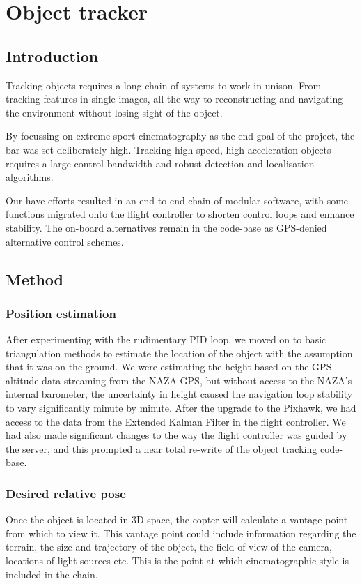 \documentclass{article}
\begin{document}
\section{Object tracker}
  \subsection{Introduction}
    Tracking objects requires a long chain of systems to work in unison.  From tracking features in single images, all the way to reconstructing and navigating the environment without losing sight of the object.


    By focussing on extreme sport cinematography as the end goal of the project, the bar was set deliberately high.
    Tracking high-speed, high-acceleration objects requires a large control bandwidth and robust detection and localisation algorithms.

    Our have efforts resulted in an end-to-end chain of modular software, with some functions migrated onto the flight controller to shorten control loops and enhance stability.  The on-board alternatives remain in the code-base as GPS-denied alternative control schemes.

  \subsection{Method}

    \subsubsection{Position estimation}
      After experimenting with the rudimentary PID loop, we moved on to basic triangulation methods to estimate the location of the object with the assumption that it was on the ground.  We were estimating the height based on the GPS altitude data streaming from the NAZA GPS, but without access to the NAZA's internal barometer, the uncertainty in height caused the navigation loop stability to vary significantly minute by minute.
      After the upgrade to the Pixhawk, we had access to the data from the Extended Kalman Filter in the flight controller.  We had also made significant changes to the way the flight controller was guided by the server, and this prompted a near total re-write of the object tracking code-base.

    \subsubsection{Desired relative pose}
      Once the object is located in 3D space, the copter will calculate a vantage point from which to view it.
      This vantage point could include information regarding the terrain, the size and trajectory of the object, the field of view of the camera, locations of light sources etc.  This is the point at which cinematographic style is included in the chain.
\end{document}
